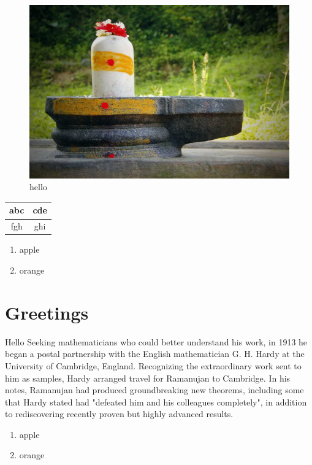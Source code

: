 \documentclass{article}
\begin{document}
\begin{figure}
\includegraphics{shiv.jpg}
\caption{hello}
\end{figure}

\begin{tabular}{|c|c|}
\hline
abc & cde \\ \hline
fgh & ghi \\ \hline
\end{tabular}

\begin{enumerate}
\item apple
\item orange
\end{enumerate}

\section{Greetings}
Hello Seeking mathematicians who could better understand his work, in 1913 he began a postal partnership with the English mathematician G. H. Hardy at the University of Cambridge, England. Recognizing the extraordinary work sent to him as samples, Hardy arranged travel for Ramanujan to Cambridge. In his notes, Ramanujan had produced groundbreaking new theorems, including some that Hardy stated had "defeated him and his colleagues completely", in addition to rediscovering recently proven but highly advanced results.

\begin{enumerate}
\item apple
\item orange
\end{enumerate}
\end{document}

